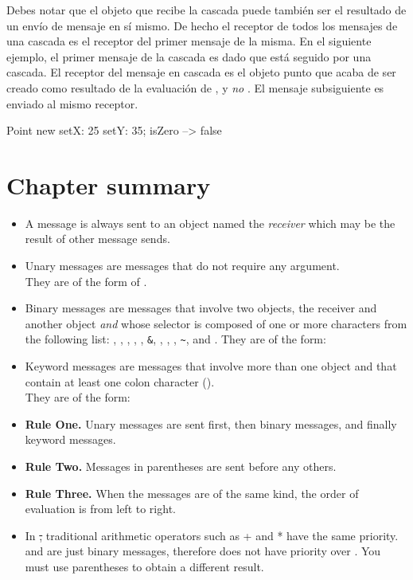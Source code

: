 \documentclass[a4paper,10pt,twoside]{book}
\begin{document}
Debes notar que el objeto que recibe la cascada puede también ser el resultado de un envío de mensaje en sí mismo.
De hecho el receptor de todos los mensajes de una cascada es el receptor del primer mensaje de la misma. En el siguiente ejemplo, el primer mensaje de la cascada es  dado que está seguido por una cascada. El receptor del mensaje en cascada  es el objeto punto que acaba de ser creado como resultado de la evaluación de , y \emph{no} . El mensaje subsiguiente  es enviado al mismo receptor.

\begin{code}{}
Point new setX: 25 setY: 35; isZero --> false
\end{code}

\section{Chapter summary}

\begin{itemize}
\item A message is always sent to an object named the \emph{receiver} which may be the result of other message sends.

\item Unary messages are messages that do not require any argument.\\
They are of the form of .

\item Binary messages are messages that involve two objects, the receiver and another object \emph{and} whose selector is composed of  one or more characters from the following list: \ct{+}, \ct{-}, \ct{*}, \ct{/}, \ct{|}, \texttt{\&}, \ct{=}, \ct{>}, \ct{<}, \texttt{\~}, and .
They are of the form: 
\item Keyword messages are messages that involve more than one object and that contain at least one colon character (\ct{:}). \\
They are of the form:

\item \textbf{Rule One.} Unary messages are sent first, then binary messages, and finally keyword messages.
\item \textbf{Rule Two.} Messages in parentheses are sent before any others.
\item \textbf{Rule Three.} When the messages are of the same kind, the order of evaluation is from left to right.
\item In \st, traditional arithmetic operators such as + and * have the same priority. \ct{+} and \ct{*} are just binary messages, therefore \ct{*} does not have priority over \ct{+}. You must use parentheses to obtain a different result.
\end{itemize}

\ifx\wholebook\relax\else
\end{document}
